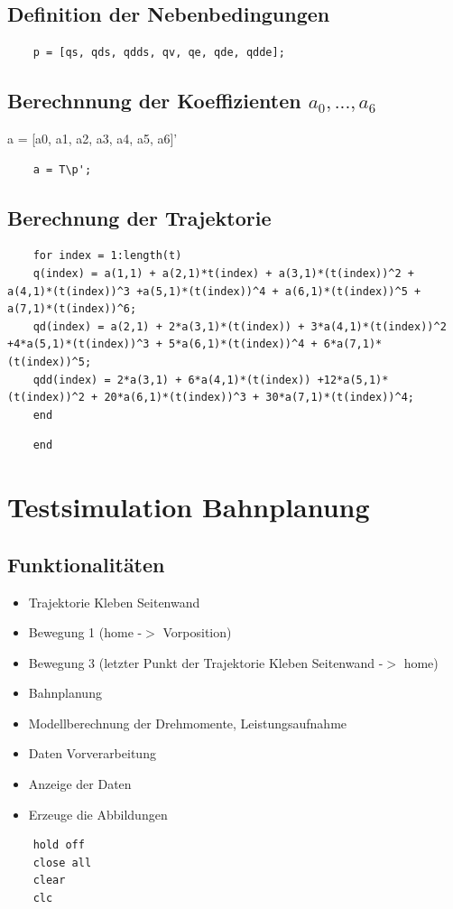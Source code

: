 \subsection*{Definition der Nebenbedingungen}
%
\begin{lstlisting}
	p = [qs, qds, qdds, qv, qe, qde, qdde];
\end{lstlisting}
%
\subsection*{Berechnnung der Koeffizienten $a_0,...,a_6$}
%
\begin{par}
	a = [a0, a1, a2, a3, a4, a5, a6]'
\end{par} \vspace{1em}
\begin{lstlisting}
	a = T\p';
\end{lstlisting}
%
\subsection*{Berechnung der Trajektorie}
%
\begin{lstlisting}
	for index = 1:length(t)
	q(index) = a(1,1) + a(2,1)*t(index) + a(3,1)*(t(index))^2 + a(4,1)*(t(index))^3 +a(5,1)*(t(index))^4 + a(6,1)*(t(index))^5 + a(7,1)*(t(index))^6;
	qd(index) = a(2,1) + 2*a(3,1)*(t(index)) + 3*a(4,1)*(t(index))^2 +4*a(5,1)*(t(index))^3 + 5*a(6,1)*(t(index))^4 + 6*a(7,1)*(t(index))^5;
	qdd(index) = 2*a(3,1) + 6*a(4,1)*(t(index)) +12*a(5,1)*(t(index))^2 + 20*a(6,1)*(t(index))^3 + 30*a(7,1)*(t(index))^4;
	end
\end{lstlisting}
\begin{lstlisting}
	end
\end{lstlisting}
%
\setcounter{chapter}{2}
\setcounter{section}{5}
\setcounter{table}{0}
\setcounter{figure}{0}
%
\section{Testsimulation Bahnplanung}
\label{add:sim}
%
\subsection*{Funktionalitäten}
%
\begin{itemize}
	\setlength{\itemsep}{-1ex}
	\item Trajektorie Kleben Seitenwand
	\item Bewegung 1 (home -\ensuremath{>} Vorposition)
	\item Bewegung 3 (letzter Punkt der Trajektorie Kleben Seitenwand -\ensuremath{>} home)
	\item Bahnplanung
	\item Modellberechnung der Drehmomente, Leistungsaufnahme
	\item Daten Vorverarbeitung
	\item Anzeige der Daten
	\item Erzeuge die Abbildungen
\end{itemize}
\begin{lstlisting}
	hold off
	close all
	clear
	clc
\end{lstlisting}
%
